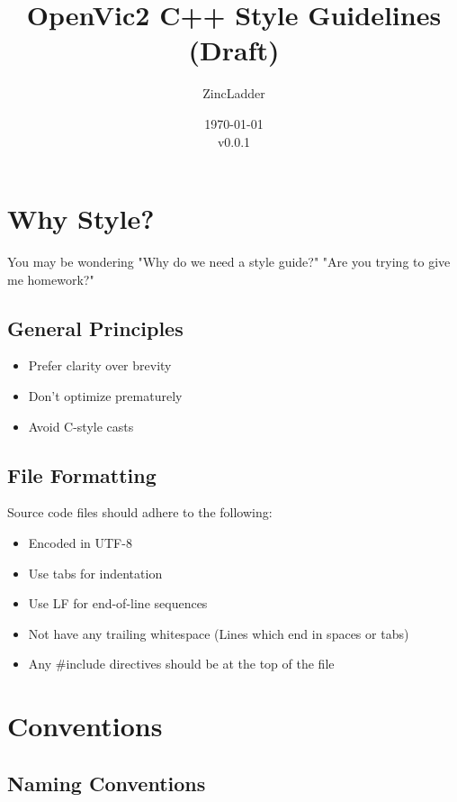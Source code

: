 \documentclass{article}
\title{OpenVic2 C++ Style Guidelines (Draft)}
\author{ZincLadder}
\date{\today\\v0.0.1}
\begin{document}

\maketitle
\tableofcontents
\clearpage

\section{Why Style?}
You may be wondering "Why do we need a style guide?" "Are you trying to give me homework?"

\subsection{General Principles}
\begin{itemize}
	\item Prefer clarity over brevity
	\item Don't optimize prematurely
	\item Avoid C-style casts
\end{itemize}

\subsection{File Formatting}
Source code files should adhere to the following:
\begin{itemize}
	\item Encoded in UTF-8
	\item Use tabs for indentation
	\item Use LF for end-of-line sequences
	\item Not have any trailing whitespace (Lines which end in spaces or tabs)
	\item Any \#include directives should be at the top of the file
\end{itemize}


\section{Conventions}
\subsection{Naming Conventions}
\end{document}
